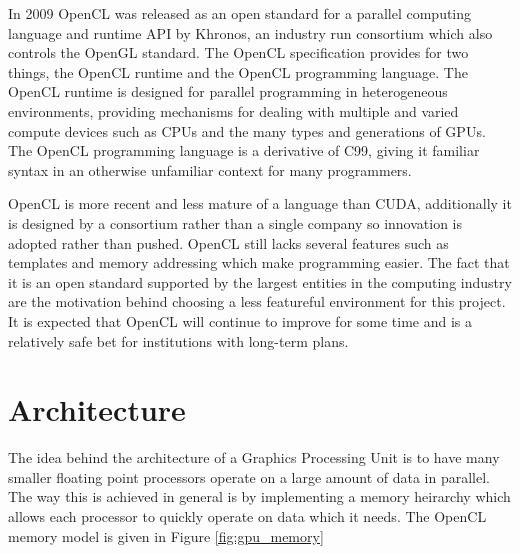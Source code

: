 In 2009 OpenCL was released as an open standard for a parallel computing
language and runtime API by Khronos, an industry run consortium which also
controls the OpenGL standard.\cite{OpenCL} The OpenCL specification provides
for two things, the OpenCL runtime and the OpenCL programming language. The
OpenCL runtime is designed for parallel programming in heterogeneous
environments, providing mechanisms for dealing with multiple and varied compute
devices such as CPUs and the many types and generations of GPUs.  The OpenCL
programming language is a derivative of C99, giving it familiar syntax in an
otherwise unfamiliar context for many programmers.


OpenCL is more recent and less mature of a language than CUDA, additionally it
is designed by a consortium rather than a single company so innovation is
adopted rather than pushed. OpenCL still lacks several features such as
templates and memory addressing which make programming easier. The fact that it
is an open standard supported by the largest entities in the computing industry
are the motivation behind choosing a less featureful environment for this
project. It is expected that OpenCL will continue to improve for some time and
is a relatively safe bet for institutions with long-term plans.



\section{Architecture}
The idea behind the architecture of a Graphics Processing Unit is to have many
smaller floating point processors operate on a large amount of data in
parallel.
The way this is achieved in general is by implementing a memory heirarchy which
allows each processor to quickly operate on data which it needs. The OpenCL 
memory model is given in Figure \ref{fig:gpu_memory}

